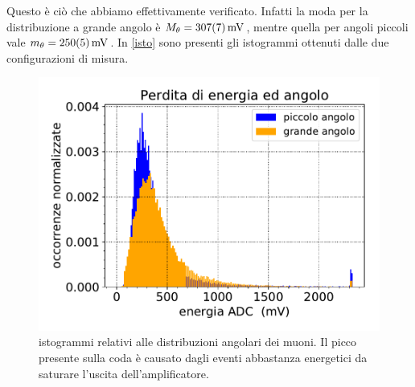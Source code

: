 Questo è ciò che abbiamo effettivamente verificato. Infatti la moda per la distribuzione a grande angolo è $M_\theta=\SI{307\pm7}{mV}$, mentre quella per angoli piccoli vale $m_\theta=\SI{250\pm5}{mV}$. In \autoref{isto} sono presenti gli istogrammi ottenuti dalle due configurazioni di misura.
\begin{figure}[h]
\centering
\includegraphics[width=8 cm]{angoli}
\caption{istogrammi relativi alle distribuzioni angolari dei muoni. Il picco presente sulla coda è causato dagli eventi abbastanza energetici da saturare l'uscita dell'amplificatore.}
\label{isto}
\end{figure}
